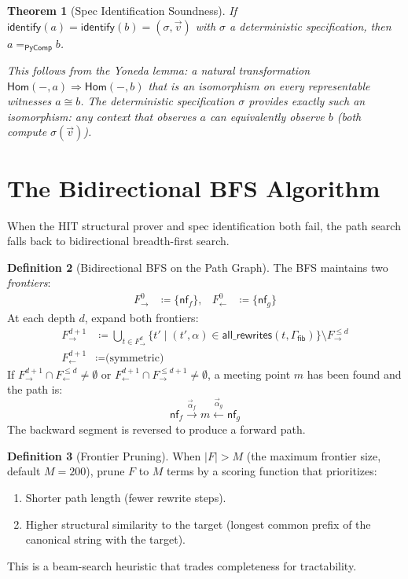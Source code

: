 \documentclass[11pt,a4paper]{report}
\theoremstyle{definition}
\newtheorem{definition}{Definition}[chapter]
\theoremstyle{plain}
\newtheorem{theorem}[definition]{Theorem}
\newcommand{\iso}{\cong}
\begin{document}
\begin{theorem}[Spec Identification Soundness]
\label{thm:spec-sound}
If $\mathsf{identify}(a) = \mathsf{identify}(b) =
(\sigma, \vec v)$ with $\sigma$ a deterministic specification,
then $a =_{\mathsf{PyComp}} b$.

This follows from the Yoneda lemma: a natural transformation
$\mathsf{Hom}(-, a) \Rightarrow \mathsf{Hom}(-, b)$ that is an
isomorphism on every representable witnesses $a \iso b$.  The
deterministic specification $\sigma$ provides exactly such an
isomorphism: any context that observes $a$ can equivalently
observe $b$ (both compute $\sigma(\vec v)$).
\end{theorem}

\section{The Bidirectional BFS Algorithm}
\label{sec:bfs-algorithm}

When the HIT structural prover and spec identification both fail,
the path search falls back to bidirectional breadth-first search.

\begin{definition}[Bidirectional BFS on the Path Graph]
\label{def:bfs-path}
The BFS maintains two \emph{frontiers}:
\begin{align}
  F_{\to}^0 &\coloneqq \{\mathsf{nf}_f\}, &
  F_{\leftarrow}^0 &\coloneqq \{\mathsf{nf}_g\}
\end{align}
At each depth $d$, expand both frontiers:
\begin{align}
  F_{\to}^{d+1} &\coloneqq \bigcup_{t \in F_{\to}^d}
    \{t' \mid (t', \alpha) \in \mathsf{all\_rewrites}(t, \Gamma_{\mathsf{fib}})\}
    \setminus F_{\to}^{\le d} \\
  F_{\leftarrow}^{d+1} &\coloneqq \text{(symmetric)}
\end{align}
If $F_{\to}^{d+1} \cap F_{\leftarrow}^{\le d} \neq \emptyset$
or $F_{\leftarrow}^{d+1} \cap F_{\to}^{\le d+1} \neq \emptyset$,
a meeting point $m$ has been found and the path is:
\[
  \mathsf{nf}_f \xrightarrow{\vec\alpha_f} m
  \xleftarrow{\vec\alpha_g} \mathsf{nf}_g
\]
The backward segment is reversed to produce a forward path.
\end{definition}

\begin{definition}[Frontier Pruning]
\label{def:frontier-pruning}
When $|F| > M$ (the maximum frontier size, default $M = 200$),
prune $F$ to $M$ terms by a scoring function that prioritizes:
\begin{enumerate}
  \item Shorter path length (fewer rewrite steps).
  \item Higher structural similarity to the target (longest
    common prefix of the canonical string with the target).
\end{enumerate}
This is a beam-search heuristic that trades completeness for
tractability.
\end{definition}
\end{document}
